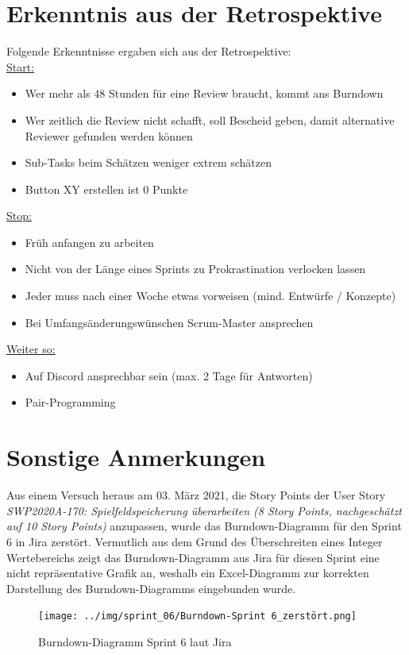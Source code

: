 \documentclass[12pt,a4paper, oneside]{article}
\begin{document}
\newpage
\section{Erkenntnis aus der Retrospektive}
Folgende Erkenntnisse ergaben sich aus der Retrospektive:\\

\underline{Start:}
\begin{itemize}
    \item Wer mehr als 48 Stunden für eine Review braucht, kommt ans Burndown
    \item Wer zeitlich die Review nicht schafft, soll Bescheid geben, damit alternative Reviewer gefunden werden können
    \item Sub-Tasks beim Schätzen weniger extrem schätzen
    \item Button XY erstellen ist 0 Punkte
    \\
\end{itemize}

\underline{Stop:}
\begin{itemize}
    \item Früh anfangen zu arbeiten
    \item Nicht von der Länge eines Sprints zu Prokrastination verlocken lassen
    \item Jeder muss nach einer Woche etwas vorweisen (mind. Entwürfe / Konzepte)
    \item Bei Umfangsänderungswünschen Scrum-Master ansprechen
    \\
\end{itemize}

\underline{Weiter so:}
\begin{itemize}
    \item Auf Discord ansprechbar sein (max. 2 Tage für Antworten)
    \item Pair-Programming
\end{itemize}

\newpage
\section{Sonstige Anmerkungen}
Aus einem Versuch heraus am 03. März 2021, die Story Points der User Story \textit{SWP2020A-170: Spielfeldspeicherung überarbeiten (8 Story Points, nachgeschätzt auf 10 Story Points)}
anzupassen, wurde das Burndown-Diagramm für den Sprint 6 in Jira zerstört. Vermutlich aus dem Grund des Überschreiten eines Integer Wertebereichs zeigt das
Burndown-Diagramm aus Jira für diesen Sprint eine nicht repräsentative Grafik an, weshalb ein Excel-Diagramm zur korrekten Darstellung des Burndown-Diagramms eingebunden wurde.
\begin{figure}[h]
    \centering
    \texttt{[image: ../img/sprint\_06/Burndown-Sprint 6\_zerstört.png]}
    \caption{Burndown-Diagramm Sprint 6 laut Jira}
    \label{fig: Burndown-Sprint6_zerstört}
\end{figure}
\end{document}
